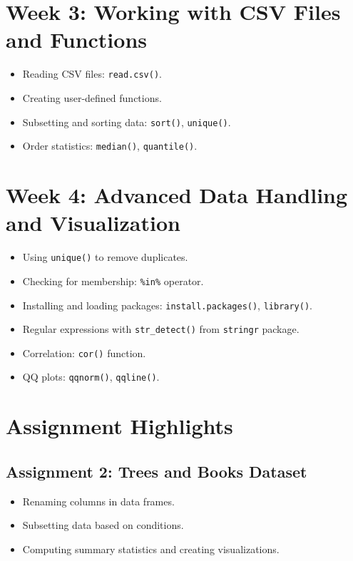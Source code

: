\documentclass{article}
\begin{document}
\section{Week 3: Working with CSV Files and Functions}
\begin{itemize}
    \item Reading CSV files: \texttt{read.csv()}.
    \item Creating user-defined functions.
    \item Subsetting and sorting data: \texttt{sort()}, \texttt{unique()}.
    \item Order statistics: \texttt{median()}, \texttt{quantile()}.
\end{itemize}



\section{Week 4: Advanced Data Handling and Visualization}
\begin{itemize}
    \item Using \texttt{unique()} to remove duplicates.
    \item Checking for membership: \texttt{\%in\%} operator.
    \item Installing and loading packages: \texttt{install.packages()}, \texttt{library()}.
    \item Regular expressions with \texttt{str\_detect()} from \texttt{stringr} package.
    \item Correlation: \texttt{cor()} function.
    \item QQ plots: \texttt{qqnorm()}, \texttt{qqline()}.
\end{itemize}


\section{Assignment Highlights}
\subsection{Assignment 2: Trees and Books Dataset}
\begin{itemize}
    \item Renaming columns in data frames.
    \item Subsetting data based on conditions.
    \item Computing summary statistics and creating visualizations.
\end{itemize}
\end{document}
